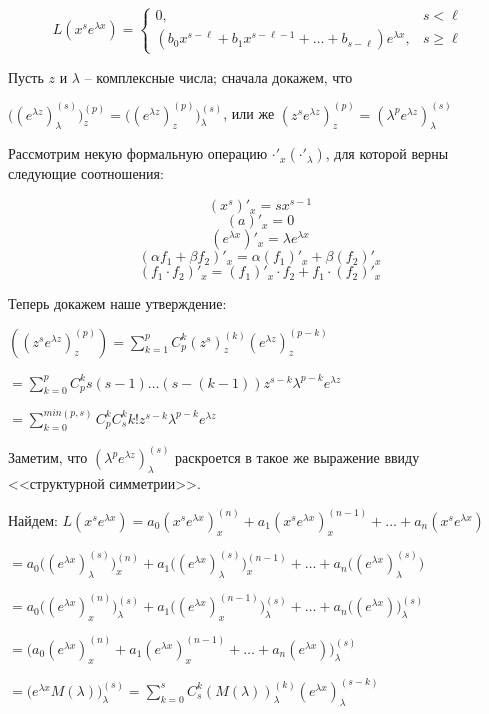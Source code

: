 $$L(x^se^{\lambda x}) =
\begin{cases}
    0,& s < \ell\\
    (b_0x^{s-\ell} + b_1x^{s-\ell -1} +  \ldots + b_{s-\ell} )e^{\lambda x},& s \geq \ell
\end{cases}
$$

\Proof
Пусть $z$ и $\lambda$ -- комплексные числа; сначала докажем, что

$\Big( (e^{\lambda z})_{\lambda}^{(s)} \Big)_z^{(p)} = \Big( (e^{\lambda z})_{z}^{(p)} \Big)_{\lambda}^{(s)}$, или же $(z^se^{\lambda z})_z^{(p)} = (\lambda^pe^{\lambda z})_{\lambda}^{(s)}$

Рассмотрим некую формальную операцию $\cdot'_x (\cdot'_{\lambda})$, для которой верны следующие соотношения:

$$(x^s)'_x = sx^{s-1}$$
$$(a)'_x = 0$$
$$(e^{\lambda x})'_x = \lambda e^{\lambda x}$$
$$(\alpha f_1 + \beta f_2)'_x = \alpha(f_1)'_x + \beta(f_2)'_x$$
$$(f_1 \cdot f_2)'_x = (f_1)'_x \cdot f_2 + f_1 \cdot (f_2)'_x$$

Теперь докажем наше утверждение:

$((z^s e^{\lambda z})_z^{(p)}) = \sum\limits_{k=1}^p C_p^k (z^s)_z^{(k)} (e^{\lambda z})_z^{(p-k)}$

$ = \sum\limits_{k=0}^pC_p^ks(s-1)\ldots(s-(k-1))z^{s-k}\lambda^{p-k}e^{\lambda z}$

$= \sum\limits_{k=0}^{min(p, s)}C_p^kC_s^kk!z^{s-k}\lambda^{p-k}e^{\lambda z}$

Заметим, что $(\lambda^pe^{\lambda z})_{\lambda}^{(s)}$ раскроется в такое же выражение ввиду <<структурной симметрии>>.

Найдем: $L(x^s e^{\lambda x}) = a_0(x^s e^{\lambda x})_x^{(n)} + a_1(x^s e^{\lambda x})_x^{(n-1)} + \ldots + a_n(x^s e^{\lambda x})$

$= a_0\Big((e^{\lambda x})_{\lambda}^{(s)}\Big)_x^{(n)} + a_1\Big((e^{\lambda x})_{\lambda}^{(s)}\Big)_x^{(n-1)} + \ldots + a_n\Big((e^{\lambda x})_{\lambda}^{(s)}\Big)$

$= a_0\Big((e^{\lambda x})_x^{(n)}\Big)_{\lambda}^{(s)} + a_1\Big((e^{\lambda x})_x^{(n-1)}\Big)_{\lambda}^{(s)} + \ldots + a_n\Big((e^{\lambda x})\Big)_{\lambda}^{(s)}$

$= \Big(a_0(e^{\lambda x})_x^{(n)} + a_1(e^{\lambda x})_x^{(n-1)} + \ldots + a_n(e^{\lambda x}) \Big)_{\lambda}^{(s)}$

$= \Big(e^{\lambda x}M(\lambda) \Big)_{\lambda}^{(s)} = \sum\limits_{k=0}^sC_s^k(M(\lambda))_{\lambda}^{(k)}(e^{\lambda x})_{\lambda}^{(s-k)}$

